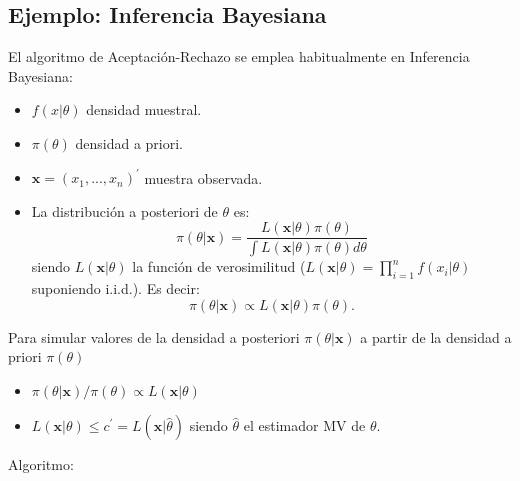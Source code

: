 \documentclass[
]{book}
\newenvironment{Shaded}{\begin{snugshade}}{\end{snugshade}}
\newcommand{\CommentTok}[1]{\textcolor[rgb]{0.56,0.35,0.01}{\textit{#1}}}
\newcommand{\DataTypeTok}[1]{\textcolor[rgb]{0.13,0.29,0.53}{#1}}
\newcommand{\DecValTok}[1]{\textcolor[rgb]{0.00,0.00,0.81}{#1}}
\newcommand{\FloatTok}[1]{\textcolor[rgb]{0.00,0.00,0.81}{#1}}
\newcommand{\KeywordTok}[1]{\textcolor[rgb]{0.13,0.29,0.53}{\textbf{#1}}}
\newcommand{\NormalTok}[1]{#1}
\newcommand{\OperatorTok}[1]{\textcolor[rgb]{0.81,0.36,0.00}{\textbf{#1}}}
\newcommand{\StringTok}[1]{\textcolor[rgb]{0.31,0.60,0.02}{#1}}
\theoremstyle{break}
\theoremstyle{definition}
\theoremstyle{definition}
\theoremstyle{definition}
\theoremstyle{remark}
\begin{document}
\begin{enumerate}
\begin{Shaded}
\end{Shaded}
\end{enumerate}

\hypertarget{ejemplo-inferencia-bayesiana}{%
\subsection{Ejemplo: Inferencia Bayesiana}\label{ejemplo-inferencia-bayesiana}}

El algoritmo de Aceptación-Rechazo se emplea habitualmente en
Inferencia Bayesiana:

\begin{itemize}
\item
  \(f(x|\theta )\) densidad muestral.
\item
  \(\pi (\theta )\) densidad a priori.
\item
  \(\mathbf{x}=(x_{1},...,x_n)^{\prime }\) muestra observada.
\item
  La distribución a posteriori de \(\theta\) es:
  \[\pi (\theta |\mathbf{x})=\frac{L(\mathbf{x}|\theta )\pi (\theta )}
  {\int L(\mathbf{x}|\theta )\pi (\theta )d\theta }\]
  siendo \(L(\mathbf{x}|\theta )\) la función de verosimilitud
  (\(L(\mathbf{x}|\theta )=\prod\limits_{i=1}^{n}f(x_{i}|\theta)\)
  suponiendo i.i.d.). Es decir:
  \[\pi (\theta |\mathbf{x})\propto L(\mathbf{x}|\theta )\pi (\theta ).\]
\end{itemize}

Para simular valores de la densidad a posteriori \(\pi (\theta | \mathbf{x})\)
a partir de la densidad a priori \(\pi (\theta )\)

\begin{itemize}
\item
  \(\pi (\theta |\mathbf{x})/\pi (\theta )\propto L(\mathbf{x}|\theta )\)
\item
  \(L(\mathbf{x}|\theta )\leq c^{\prime }=L(\mathbf{x}|\hat{\theta})\) siendo
  \(\hat{\theta}\) el estimador MV de \(\theta\).
\end{itemize}

Algoritmo:
\end{document}
